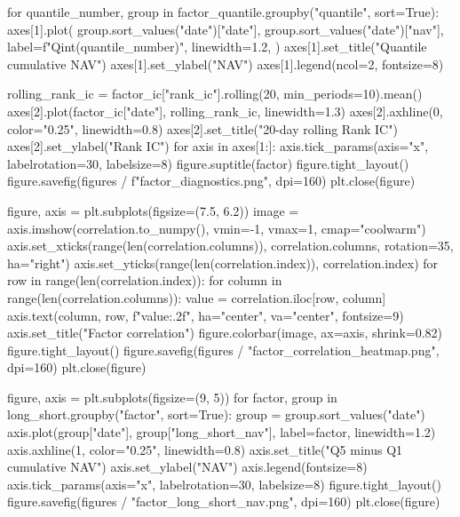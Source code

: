 \documentclass[UTF8,a4paper,fontset=fandol]{ctexart}
\begin{document}
\begin{ProjectCode}
{        for quantile_number, group in factor_quantile.groupby("quantile", sort=True):
            axes[1].plot(
                group.sort_values("date")["date"],
                group.sort_values("date")["nav"],
                label=f"Q{int(quantile_number)}",
                linewidth=1.2,
            )
        axes[1].set_title("Quantile cumulative NAV")
        axes[1].set_ylabel("NAV")
        axes[1].legend(ncol=2, fontsize=8)

        rolling_rank_ic = factor_ic["rank_ic"].rolling(20, min_periods=10).mean()
        axes[2].plot(factor_ic["date"], rolling_rank_ic, linewidth=1.3)
        axes[2].axhline(0, color="0.25", linewidth=0.8)
        axes[2].set_title("20-day rolling Rank IC")
        axes[2].set_ylabel("Rank IC")
        for axis in axes[1:]:
            axis.tick_params(axis="x", labelrotation=30, labelsize=8)
        figure.suptitle(factor)
        figure.tight_layout()
        figure.savefig(figures / f"{factor}_diagnostics.png", dpi=160)
        plt.close(figure)

    figure, axis = plt.subplots(figsize=(7.5, 6.2))
    image = axis.imshow(correlation.to_numpy(), vmin=-1, vmax=1, cmap="coolwarm")
    axis.set_xticks(range(len(correlation.columns)), correlation.columns, rotation=35, ha="right")
    axis.set_yticks(range(len(correlation.index)), correlation.index)
    for row in range(len(correlation.index)):
        for column in range(len(correlation.columns)):
            value = correlation.iloc[row, column]
            axis.text(column, row, f"{value:.2f}", ha="center", va="center", fontsize=9)
    axis.set_title("Factor correlation")
    figure.colorbar(image, ax=axis, shrink=0.82)
    figure.tight_layout()
    figure.savefig(figures / "factor_correlation_heatmap.png", dpi=160)
    plt.close(figure)

    figure, axis = plt.subplots(figsize=(9, 5))
    for factor, group in long_short.groupby("factor", sort=True):
        group = group.sort_values("date")
        axis.plot(group["date"], group["long_short_nav"], label=factor, linewidth=1.2)
    axis.axhline(1, color="0.25", linewidth=0.8)
    axis.set_title("Q5 minus Q1 cumulative NAV")
    axis.set_ylabel("NAV")
    axis.legend(fontsize=8)
    axis.tick_params(axis="x", labelrotation=30, labelsize=8)
    figure.tight_layout()
    figure.savefig(figures / "factor_long_short_nav.png", dpi=160)
    plt.close(figure)


}
\end{ProjectCode}
\end{document}
